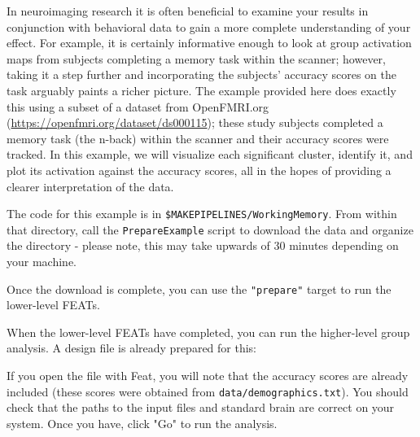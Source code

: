 \label{sec:groupfeatreport}
In neuroimaging research it is often beneficial to examine your results in conjunction with behavioral data to gain a more complete understanding of your effect. For example, it is certainly informative enough to look at group activation maps from subjects completing a memory task within the scanner; however, taking it a step further and incorporating the subjects' accuracy scores on the task arguably paints a richer picture. The example provided here does exactly this using a subset of a dataset from OpenFMRI.org  (\url{https://openfmri.org/dataset/ds000115}); these study subjects completed a memory task (the n-back) within the scanner and their accuracy scores were tracked. In this example, we will visualize each significant cluster, identify it, and plot its activation against the accuracy scores, all in the hopes of providing a clearer interpretation of the data.  
 
The code for this example is in \texttt{\$MAKEPIPELINES/WorkingMemory}. From within that directory, call the \texttt{PrepareExample} script to download the data and organize the directory - please note, this may take upwards of 30 minutes depending on your machine. 

Once the download is complete, you can use the \texttt{"prepare"} target to run the lower-level FEATs.

When the lower-level FEATs have completed, you can run the higher-level group analysis. A design file is already prepared for this:

If you open the file with Feat, you will note that the accuracy scores are already included (these scores were obtained from \texttt{data/demographics.txt}). You should check that the paths to the input files and standard brain are correct on your system. Once you have, click "Go" to run the analysis. 

